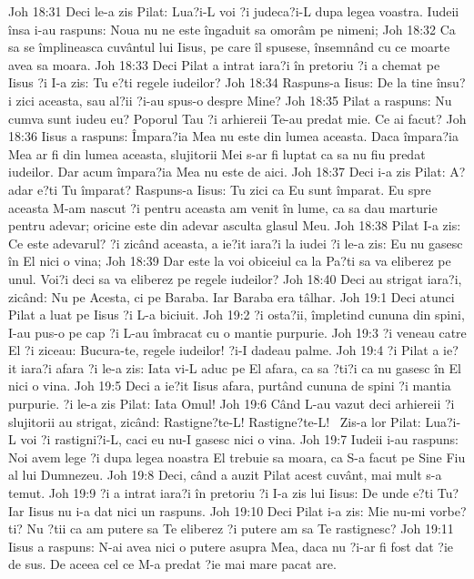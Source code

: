 Joh 18:31  Deci le-a zis Pilat: Lua?i-L voi ?i judeca?i-L dupa legea voastra. Iudeii însa i-au raspuns: Noua nu ne este îngaduit sa omorâm pe nimeni;
Joh 18:32  Ca sa se împlineasca cuvântul lui Iisus, pe care îl spusese, însemnând cu ce moarte avea sa moara.
Joh 18:33  Deci Pilat a intrat iara?i în pretoriu ?i a chemat pe Iisus ?i I-a zis: Tu e?ti regele iudeilor?
Joh 18:34  Raspuns-a Iisus: De la tine însu?i zici aceasta, sau al?ii ?i-au spus-o despre Mine?
Joh 18:35  Pilat a raspuns: Nu cumva sunt iudeu eu? Poporul Tau ?i arhiereii Te-au predat mie. Ce ai facut?
Joh 18:36  Iisus a raspuns: Împara?ia Mea nu este din lumea aceasta. Daca împara?ia Mea ar fi din lumea aceasta, slujitorii Mei s-ar fi luptat ca sa nu fiu predat iudeilor. Dar acum împara?ia Mea nu este de aici.
Joh 18:37  Deci i-a zis Pilat: A?adar e?ti Tu împarat? Raspuns-a Iisus: Tu zici ca Eu sunt împarat. Eu spre aceasta M-am nascut ?i pentru aceasta am venit în lume, ca sa dau marturie pentru adevar; oricine este din adevar asculta glasul Meu.
Joh 18:38  Pilat I-a zis: Ce este adevarul? ?i zicând aceasta, a ie?it iara?i la iudei ?i le-a zis: Eu nu gasesc în El nici o vina;
Joh 18:39  Dar este la voi obiceiul ca la Pa?ti sa va eliberez pe unul. Voi?i deci sa va eliberez pe regele iudeilor?
Joh 18:40  Deci au strigat iara?i, zicând: Nu pe Acesta, ci pe Baraba. Iar Baraba era tâlhar.
Joh 19:1  Deci atunci Pilat a luat pe Iisus ?i L-a biciuit.
Joh 19:2  ?i osta?ii, împletind cununa din spini, I-au pus-o pe cap ?i L-au îmbracat cu o mantie purpurie.
Joh 19:3  ?i veneau catre El ?i ziceau: Bucura-te, regele iudeilor! ?i-I dadeau palme.
Joh 19:4  ?i Pilat a ie?it iara?i afara ?i le-a zis: Iata vi-L aduc pe El afara, ca sa ?ti?i ca nu gasesc în El nici o vina.
Joh 19:5  Deci a ie?it Iisus afara, purtând cununa de spini ?i mantia purpurie. ?i le-a zis Pilat: Iata Omul!
Joh 19:6  Când L-au vazut deci arhiereii ?i slujitorii au strigat, zicând: Rastigne?te-L! Rastigne?te-L!  Zis-a lor Pilat: Lua?i-L voi ?i rastigni?i-L, caci eu nu-I gasesc nici o vina.
Joh 19:7  Iudeii i-au raspuns: Noi avem lege ?i dupa legea noastra El trebuie sa moara, ca S-a facut pe Sine Fiu al lui Dumnezeu.
Joh 19:8  Deci, când a auzit Pilat acest cuvânt, mai mult s-a temut.
Joh 19:9  ?i a intrat iara?i în pretoriu ?i I-a zis lui Iisus: De unde e?ti Tu? Iar Iisus nu i-a dat nici un raspuns.
Joh 19:10  Deci Pilat i-a zis: Mie nu-mi vorbe?ti? Nu ?tii ca am putere sa Te eliberez ?i putere am sa Te rastignesc?
Joh 19:11  Iisus a raspuns: N-ai avea nici o putere asupra Mea, daca nu ?i-ar fi fost dat ?ie de sus. De aceea cel ce M-a predat ?ie mai mare pacat are.
